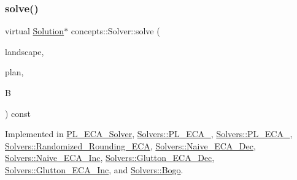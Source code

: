 \mbox{\label{classconcepts_1_1_solver_af323ad29df1e7b87facd7dc007568c80}} 
\subsubsection{\texorpdfstring{solve()}{solve()}}
{\footnotesize\ttfamily virtual \hyperlink{class_solution}{Solution}$\ast$ concepts\+::\+Solver\+::solve (\begin{DoxyParamCaption}\item[{const \hyperlink{class_landscape}{Landscape} \&}]{landscape,  }\item[{const \hyperlink{class_restoration_plan}{Restoration\+Plan} \&}]{plan,  }\item[{const double}]{B }\end{DoxyParamCaption}) const\hspace{0.3cm}{\ttfamily [pure virtual]}}



Implemented in \hyperlink{class_p_l___e_c_a___solver_a7fe728bb23be76b4aa51e669b73ee10d}{P\+L\+\_\+\+E\+C\+A\+\_\+\+Solver}, \hyperlink{class_solvers_1_1_p_l___e_c_a__3_ae296efd0061d2fbf478732bc9c280202}{Solvers\+::\+P\+L\+\_\+\+E\+C\+A\+\_}, \hyperlink{class_solvers_1_1_p_l___e_c_a__2_a07601fa43e0c530e7a66b1532a9e96a6}{Solvers\+::\+P\+L\+\_\+\+E\+C\+A\+\_}, \hyperlink{class_solvers_1_1_randomized___rounding___e_c_a_a2b2c1f0da1e047a5add3fd1bb5e6f0e8}{Solvers\+::\+Randomized\+\_\+\+Rounding\+\_\+\+E\+CA}, \hyperlink{class_solvers_1_1_naive___e_c_a___dec_a51e13c5f7dac3c937f1a006c8b651657}{Solvers\+::\+Naive\+\_\+\+E\+C\+A\+\_\+\+Dec}, \hyperlink{class_solvers_1_1_naive___e_c_a___inc_af0830eeb54be59ae2f363a32f38cee0c}{Solvers\+::\+Naive\+\_\+\+E\+C\+A\+\_\+\+Inc}, \hyperlink{class_solvers_1_1_glutton___e_c_a___dec_a6b7078518779722dfaed6b1b1a9ba502}{Solvers\+::\+Glutton\+\_\+\+E\+C\+A\+\_\+\+Dec}, \hyperlink{class_solvers_1_1_glutton___e_c_a___inc_a12c872bf34761d875649f3e029dbc952}{Solvers\+::\+Glutton\+\_\+\+E\+C\+A\+\_\+\+Inc}, and \hyperlink{class_solvers_1_1_bogo_a094c019a0efda929bd2369d2a47256f6}{Solvers\+::\+Bogo}.

\mbox{\label{classconcepts_1_1_solver_a3f9ca298d2c2ccaa4e1c8337866b8021}} 
